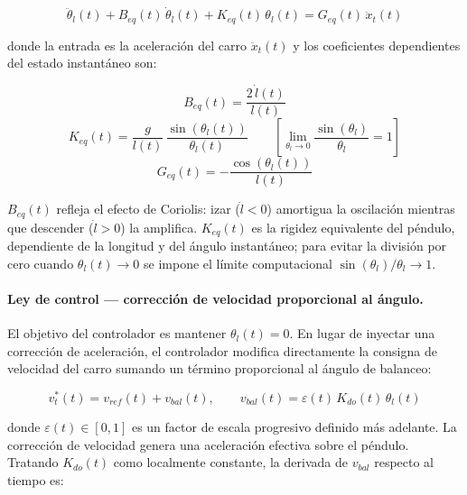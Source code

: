 \documentclass[12pt, a4paper]{article}
\begin{document}
\begin{equation}
    \label{eq:lpv-sway}
    \ddot{\theta}_l(t) + B_{eq}(t)\,\dot{\theta}_l(t) + K_{eq}(t)\,\theta_l(t)
    = G_{eq}(t)\,\ddot{x}_t(t)
\end{equation}

donde la entrada es la aceleración del carro $\ddot{x}_t(t)$ y los coeficientes
dependientes del estado instantáneo son:

\begin{equation}
    \label{eq:Beq}
    B_{eq}(t) = \frac{2\,\dot{l}(t)}{l(t)}
\end{equation}
\begin{equation}
    \label{eq:Keq}
    K_{eq}(t) = \frac{g}{l(t)}\,\frac{\sin(\theta_l(t))}{\theta_l(t)}
    \qquad\left[\lim_{\theta_l\to 0}\frac{\sin(\theta_l)}{\theta_l}=1\right]
\end{equation}
\begin{equation}
    \label{eq:Geq}
    G_{eq}(t) = -\frac{\cos(\theta_l(t))}{l(t)}
\end{equation}

$B_{eq}(t)$ refleja el efecto de Coriolis: izar ($\dot{l}<0$) amortigua la
oscilación mientras que descender ($\dot{l}>0$) la amplifica. $K_{eq}(t)$ es la
rigidez equivalente del péndulo, dependiente de la longitud y del ángulo instantáneo;
para evitar la división por cero cuando $\theta_l(t)\to 0$ se impone el límite
computacional $\sin(\theta_l)/\theta_l\to 1$.

\paragraph{Ley de control — corrección de velocidad proporcional al ángulo.}

El objetivo del controlador es mantener $\theta_l(t)=0$. En lugar de inyectar una
corrección de aceleración, el controlador modifica directamente la consigna de velocidad
del carro sumando un término proporcional al ángulo de balanceo:

\begin{equation}
    \label{eq:ctrl-sway}
    v_t^{*}(t) = v_{ref}(t) + v_{bal}(t),
    \qquad
    v_{bal}(t) = \varepsilon(t)\,K_{do}(t)\,\theta_l(t)
\end{equation}

donde $\varepsilon(t)\in[0,1]$ es un factor de escala progresivo definido más adelante.
La corrección de velocidad genera una aceleración efectiva sobre el péndulo. Tratando
$K_{do}(t)$ como localmente constante, la derivada de $v_{bal}$ respecto al tiempo es:
\end{document}
